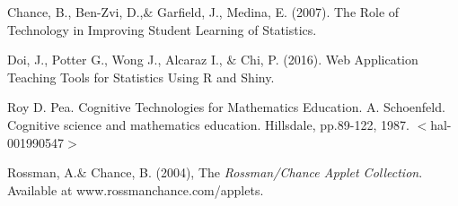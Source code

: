 \documentclass[11pt]{book}
\begin{document}
\begin{thebibliography}{1}

  Chance, B., Ben-Zvi, D.,$\&$ Garfield, J.,  Medina, E. (2007). The Role of Technology in Improving Student Learning of Statistics.

  Doi, J., Potter G., Wong J., Alcaraz I., $\&$ Chi, P. (2016). Web Application Teaching Tools for Statistics Using R and Shiny. 

 Roy D. Pea. Cognitive Technologies for Mathematics Education. A. Schoenfeld. Cognitive science and mathematics education. Hillsdale, pp.89-122, 1987. $<$hal-001990547$>$

 Rossman, A.$\&$ Chance, B. (2004), The \emph{Rossman/Chance Applet Collection}. Available at www.rossmanchance.com/applets.

\end{thebibliography}
\end{document}
